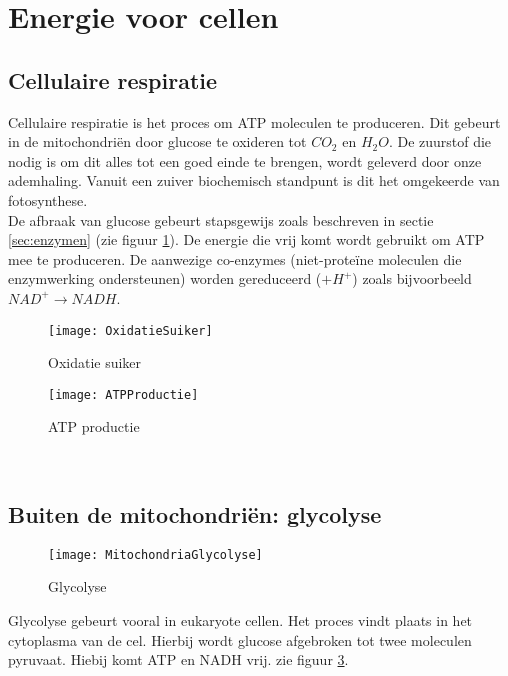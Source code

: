 \documentclass[a4paper,kul]{kulakarticle} %
\begin{document}
\section{Energie voor cellen}
\label{sec:energie}
\subsection{Cellulaire respiratie}
Cellulaire respiratie is het proces om ATP moleculen te produceren. Dit gebeurt in de mitochondriën door glucose te oxideren tot $CO_2$ en $H_2O$. De zuurstof die nodig is om dit alles tot een goed einde te brengen, wordt geleverd door onze ademhaling. Vanuit een zuiver biochemisch standpunt is dit het omgekeerde van fotosynthese.
\\
De afbraak van glucose gebeurt stapsgewijs zoals beschreven in sectie \ref{sec:enzymen} (zie figuur \ref{fig:oxidatiesuiker}). De energie die vrij komt wordt gebruikt om ATP mee te produceren. De aanwezige co-enzymes (niet-proteïne moleculen die enzymwerking ondersteunen) worden gereduceerd ($+H^+$) zoals bijvoorbeeld $NAD^+ \rightarrow NADH$.
\begin{figure}[h]
	\centering
	\texttt{[image: OxidatieSuiker]}
	\caption[Oxidatie suiker]{Oxidatie suiker}
	\label{fig:oxidatiesuiker}
\end{figure}
\begin{figure}[h]
	\centering
	\texttt{[image: ATPProductie]}
	\caption[ATP productie]{ATP productie}
	\label{fig:atpproductie}
\end{figure}\\
\newpage
\subsection{Buiten de mitochondriën: glycolyse}
\begin{figure}[h]
	\centering
	\texttt{[image: MitochondriaGlycolyse]}
	\caption[Glycolyse]{Glycolyse}
	\label{fig:mitochondriaglycolyse}
\end{figure}
Glycolyse gebeurt vooral in eukaryote cellen. Het proces vindt plaats in het cytoplasma van de cel. Hierbij wordt glucose afgebroken tot twee moleculen pyruvaat. Hiebij komt ATP en NADH vrij. zie figuur \ref{fig:mitochondriaglycolyse}.
\end{document}
